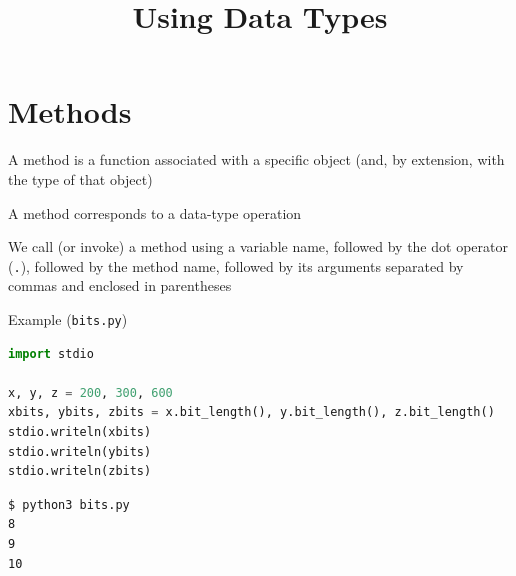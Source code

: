 \documentclass[8pt,a4paper,compress]{beamer}
\title{Using Data Types}
\date{}
\begin{document}
\begin{frame}
\vfill
\titlepage
\end{frame}

\section{Methods}
\begin{frame}[fragile]
\pause

A method is a function associated with a specific object (and, by extension, with the type of that object)

\pause
\bigskip

A method corresponds to a data-type operation

\pause
\bigskip

We call (or invoke) a method using a variable name, followed by the dot operator (\lstinline{.}), followed by the method name, followed by its arguments separated by commas and enclosed in parentheses

\pause
\bigskip

Example (\lstinline{bits.py})

\smallskip

\begin{lstlisting}[language=python,style=focusin]
import stdio

x, y, z = 200, 300, 600
xbits, ybits, zbits = x.bit_length(), y.bit_length(), z.bit_length()
stdio.writeln(xbits)
stdio.writeln(ybits)
stdio.writeln(zbits)
\end{lstlisting}

\pause
\bigskip

\begin{lstlisting}[language={},style=focusin]
$ python3 bits.py
8
9
10
\end{lstlisting}
\end{frame}
\end{document}
